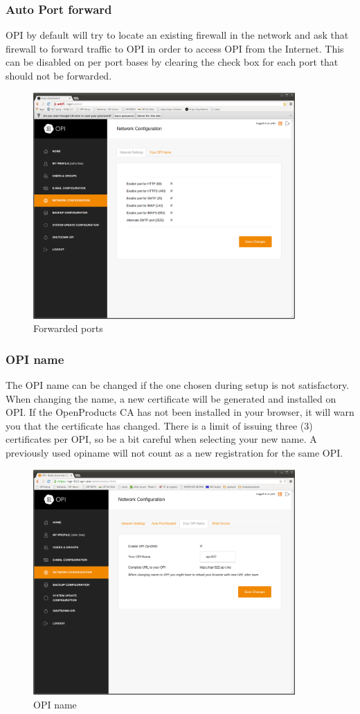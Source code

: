 \documentclass[12pt,a4paper,titlepage]{article}
\begin{document}
\subsubsection{Auto Port forward}
OPI by default will try to locate an existing firewall in the network and ask that firewall to forward traffic to OPI in order to access OPI from the Internet. This can be disabled on per port bases by clearing the check box for each port that should not be forwarded.
\begin{figure}[h!]
\centering
\includegraphics[width=10cm]{./img/network-config-1}
\caption{Forwarded ports}
\end{figure}
\FloatBarrier
\subsubsection{OPI name}
The OPI name can be changed if the one chosen during setup is not satisfactory. When changing the name, a new certificate will be generated and installed on OPI. If the OpenProducts CA has not been installed in your browser, it will warn you that the certificate has changed.
There is a limit of issuing three (3) certificates per OPI, so be a bit careful when selecting your new name. A previously used opiname will not count as a new registration for the same OPI.
\begin{figure}[h!]
\centering
\includegraphics[width=10cm]{./img/network-opiname}
\caption{OPI name}
\end{figure}
\FloatBarrier
\end{document}
